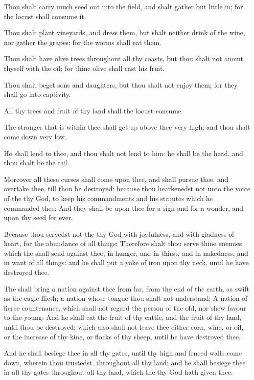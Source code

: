 \Verse Thou shalt carry much seed out into the field, and shalt gather but little in; for the locust shall consume it.

\Verse Thou shalt plant vineyards, and dress them, but shalt neither drink of the wine, nor gather the grapes; for the worms shall eat them.

\Verse Thou shalt have olive trees throughout all thy coasts, but thou shalt not anoint thyself with the oil; for thine olive shall cast his fruit.

\Verse Thou shalt beget sons and daughters, but thou shalt not enjoy them; for they shall go into captivity.

\Verse All thy trees and fruit of thy land shall the locust consume.

\Verse The stranger that is within thee shall get up above thee very high; and thou shalt come down very low.

\Verse He shall lend to thee, and thou shalt not lend to him: he shall be the head, and thou shalt be the tail.

\Verse Moreover all these curses shall come upon thee, and shall pursue thee, and overtake thee, till thou be destroyed; because thou hearkenedst not unto the voice of the \LORD thy God, to keep his commandments and his statutes which he commanded thee: \Verse And they shall be upon thee for a sign and for a wonder, and upon thy seed for ever.

\Verse Because thou servedst not the \LORD thy God with joyfulness, and with gladness of heart, for the abundance of all things; \Verse Therefore shalt thou serve thine enemies which the \LORD shall send against thee, in hunger, and in thirst, and in nakedness, and in want of all things: and he shall put a yoke of iron upon thy neck, until he have destroyed thee.

\Verse The \LORD shall bring a nation against thee from far, from the end of the earth, as swift as the eagle flieth; a nation whose tongue thou shalt not understand; \Verse A nation of fierce countenance, which shall not regard the person of the old, nor shew favour to the young: \Verse And he shall eat the fruit of thy cattle, and the fruit of thy land, until thou be destroyed: which also shall not leave thee either corn, wine, or oil, or the increase of thy kine, or flocks of thy sheep, until he have destroyed thee.

\Verse And he shall besiege thee in all thy gates, until thy high and fenced walls come down, wherein thou trustedst, throughout all thy land: and he shall besiege thee in all thy gates throughout all thy land, which the \LORD thy God hath given thee.

